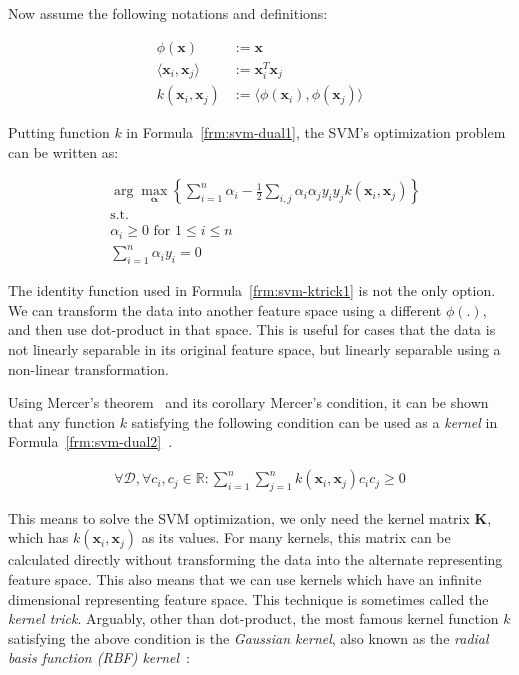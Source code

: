 Now assume the following notations and definitions:

\begin{align}
  \phi(\mathbf{x}) &:= \mathbf{x} \nonumber \\
  \langle \mathbf{x}_i, \mathbf{x}_j \rangle &:= \mathbf{x}_i^T \mathbf{x}_j \nonumber \\
  k(\mathbf{x}_i, \mathbf{x}_j) &:= \langle \phi(\mathbf{x}_i), \phi(\mathbf{x}_j) \rangle
  \label{frm:svm-ktrick1}
\end{align}

Putting function $k$ in Formula~\ref{frm:svm-dual1}, the SVM's optimization problem can be written as:

\begin{align}
  &\arg\max_{\boldsymbol{\alpha}}\left\{\sum_{i=1}^n \alpha_i - \frac{1}{2}\sum_{i, j} \alpha_i \alpha_j y_i y_j k(\mathbf{x}_i, \mathbf{x}_j)\right\} \nonumber \\
  &\text{s.t.} \nonumber \\
  &\alpha_i \geq 0 \text{ for } 1 \leq i \leq n \nonumber \\
  &\sum_{i=1}^{n}\alpha_i y_i = 0
  \label{frm:svm-dual2}
\end{align}

The identity function used in Formula~\ref{frm:svm-ktrick1} is not the only option. We can transform the data into another feature space using a different $\phi(.)$, and then use dot-product in that space. This is useful for cases that the data is not linearly separable in its original feature space, but linearly separable using a non-linear transformation.

Using Mercer's theorem~\cite{mercer-theorem} and its corollary Mercer's condition, it can be shown that any function $k$ satisfying the following condition can be used as a \emph{kernel} in Formula~\ref{frm:svm-dual2}~\cite[Ch. 2.2]{learning-with-kernels}.

\begin{align}
  \forall \mathcal{D}, \forall c_i, c_j \in \mathbb{R}: \sum_{i=1}^n\sum_{j=1}^n k(\mathbf{x}_i, \mathbf{x}_j) c_i c_j \geq 0
  \label{frm:positive-definite}
\end{align}

This means to solve the SVM optimization, we only need the kernel matrix $\mathbf{K}$, which has $k(\mathbf{x}_i, \mathbf{x}_j)$ as its values. For many kernels, this matrix can be calculated directly without transforming the data into the alternate representing feature space. This also means that we can use kernels which have an infinite dimensional representing feature space. This technique is sometimes called the \emph{kernel trick}. Arguably, other than dot-product, the most famous kernel function $k$ satisfying the above condition is the \emph{Gaussian kernel}, also known as the \emph{radial basis function (RBF) kernel}~\cite[Ch. 2]{learning-with-kernels}:


